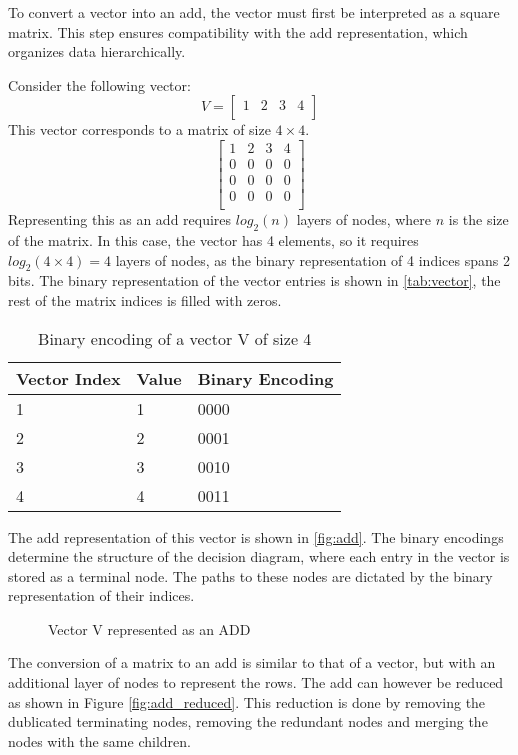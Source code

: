 To convert a vector into an \gls{add}, the vector must first be interpreted as a square matrix. 
This step ensures compatibility with the \gls{add} representation, which organizes data hierarchically. 

Consider the following vector:
\[
V= 
\begin{bmatrix}
    1 & 2 & 3 & 4 \\
\end{bmatrix}
\]
This vector corresponds to a matrix of size $4 \times 4$.
\[
\begin{bmatrix}
    1 & 2 & 3 & 4 \\
    0 & 0 & 0 & 0 \\
    0 & 0 & 0 & 0 \\
    0 & 0 & 0 & 0 \\
\end{bmatrix}
\]
Representing this as an \gls{add} requires $log_2(n)$ layers of nodes, where $n$ is the size of the matrix. In this case, the vector has 4 elements, so it requires $log_2(4 \times 4) = 4$ layers of nodes, as the binary representation of 4 indices spans 2 bits.
The binary representation of the vector entries is shown in \autoref{tab:vector}, the rest of the matrix indices is filled with zeros.

\begin{table}
\centering
\caption{Binary encoding of a vector V of size 4}
\label{tab:vector}
\begin{tabular}{lll}
\toprule
Vector Index & Value & Binary Encoding \\
\midrule
1 & 1 & 0000 \\
2 & 2 & 0001 \\
3 & 3 & 0010 \\
4 & 4 & 0011 \\
\bottomrule
\end{tabular}
\end{table}

The \gls{add} representation of this vector is shown in \autoref{fig:add}. The binary encodings determine the structure of the decision diagram, where each entry in the vector is stored as a terminal node. The paths to these nodes are dictated by the binary representation of their indices.
\begin{figure*}
    \centering
    
    \caption{Vector V represented as an ADD}
    \label{fig:add}
\end{figure*}

The conversion of a matrix to an \gls{add} is similar to that of a vector, but with an additional layer of nodes to represent the rows.
The \gls{add} can however be reduced as shown in Figure \autoref{fig:add_reduced}.
This reduction is done by removing the dublicated terminating nodes, removing the redundant nodes and merging the nodes with the same children. 


